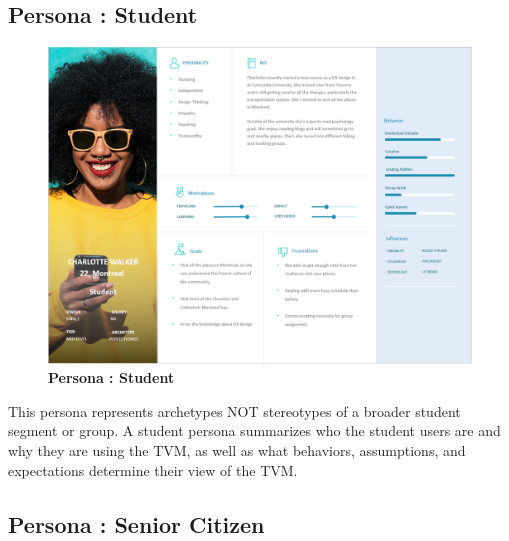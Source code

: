 \documentclass[15pt]{article}
\begin{document}
\subsection{Persona : Student}
\vspace{0.5cm}

\begin{figure}[H]
\centering
\includegraphics[width=1\textwidth]{Persona1.PNG}\par\vspace{0.1cm}
\caption{\Large\bfseries{Persona : Student}}
\label{Persona : Student:do}
\end{figure}

This persona represents archetypes NOT stereotypes of a broader student segment or group. A student persona summarizes who the student users are and why they are using the TVM, as well as what behaviors, assumptions, and expectations determine their view of the TVM.
\subsection{Persona : Senior Citizen}
\vspace{0.5cm}
\end{document}
